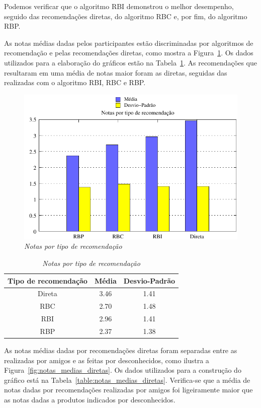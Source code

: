 Podemos verificar que o algoritmo RBI demonstrou o melhor desempenho, seguido das recomendações diretas, do algoritmo RBC e, por fim, do algoritmo RBP.

 As notas médias dadas pelos participantes estão discriminadas por algoritmos de recomendação e pelas recomendações diretas, como mostra a Figura~\ref{fig:notas_medias}. Os dados utilizados para a elaboração do gráficos estão na Tabela~\ref{table:notas_medias}. As recomendações que resultaram em uma média de notas maior foram as diretas, seguidas das realizadas com o algoritmo RBI, RBC e RBP.
 
\begin{figure}
    \centering
    \includegraphics[width=\textwidth]{imagens/grafico_notas_medias}
    \caption{\it Notas por tipo de recomendação}
    \label{fig:notas_medias}
\end{figure}

\begin{table}
\centering
\begin{tabular}{c c c}
    \hline \hline
    \textbf{Tipo de recomendação} & \textbf{Média}& \textbf{Desvio-Padrão} \\
\hline 
Direta & 3.46 & 1.41 \\
\hline 
RBC & 2.70 & 1.48 \\
\hline 
RBI & 2.96 & 1.41 \\
\hline 
RBP & 2.37 & 1.38 \\
\hline        
\end{tabular}
\caption{\it Notas por tipo de recomendação}
\label{table:notas_medias}
\end{table}

 As notas médias dadas por recomendações diretas foram separadas entre as realizadas por amigos e as feitas por desconhecidos, como ilustra a Figura~\ref{fig:notas_medias_diretas}. Os dados utilizados para a construção do gráfico está na Tabela~\ref{table:notas_medias_diretas}. Verifica-se que a média de notas dadas por recomendações realizadas por amigos foi ligeiramente maior que as notas dadas a produtos indicados por desconhecidos.

